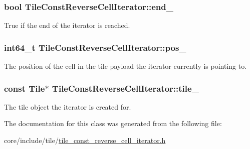 \subsubsection[{end\+\_\+}]{\setlength{\rightskip}{0pt plus 5cm}bool Tile\+Const\+Reverse\+Cell\+Iterator\+::end\+\_\+\hspace{0.3cm}{\ttfamily [private]}}\label{classTileConstReverseCellIterator_aaff2497e0027a4235c572d33018f445f}
True if the end of the iterator is reached. \hypertarget{classTileConstReverseCellIterator_a84f7b3b5db850f49c69fce9d7a48d923}{}
\subsubsection[{pos\+\_\+}]{\setlength{\rightskip}{0pt plus 5cm}int64\+\_\+t Tile\+Const\+Reverse\+Cell\+Iterator\+::pos\+\_\+\hspace{0.3cm}{\ttfamily [private]}}\label{classTileConstReverseCellIterator_a84f7b3b5db850f49c69fce9d7a48d923}
The position of the cell in the tile payload the iterator currently is pointing to. \hypertarget{classTileConstReverseCellIterator_af5e9ab6d7ac7cc740164071db4e53885}{}
\subsubsection[{tile\+\_\+}]{\setlength{\rightskip}{0pt plus 5cm}const {\bf Tile}$\ast$ Tile\+Const\+Reverse\+Cell\+Iterator\+::tile\+\_\+\hspace{0.3cm}{\ttfamily [private]}}\label{classTileConstReverseCellIterator_af5e9ab6d7ac7cc740164071db4e53885}
The tile object the iterator is created for. 

The documentation for this class was generated from the following file\+:\begin{DoxyCompactItemize}
\item 
core/include/tile/\hyperlink{tile__const__reverse__cell__iterator_8h}{tile\+\_\+const\+\_\+reverse\+\_\+cell\+\_\+iterator.\+h}\end{DoxyCompactItemize}
